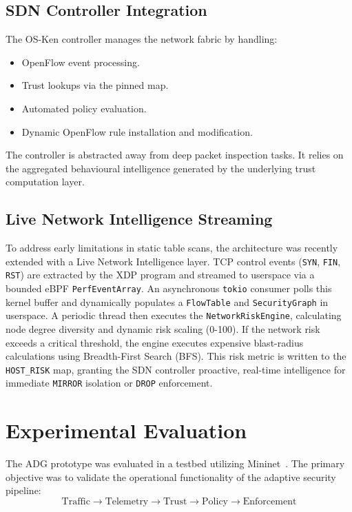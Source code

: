 \documentclass[conference]{IEEEtran}
\begin{document}
\subsection{SDN Controller Integration}
The OS-Ken controller manages the network fabric by handling:
\begin{itemize}
\item OpenFlow event processing.
\item Trust lookups via the pinned map.
\item Automated policy evaluation.
\item Dynamic OpenFlow rule installation and modification.
\end{itemize}
The controller is abstracted away from deep packet inspection tasks. It relies on the aggregated behavioural intelligence generated by the underlying trust computation layer.

\subsection{Live Network Intelligence Streaming}
To address early limitations in static table scans, the architecture was recently extended with a Live Network Intelligence layer. TCP control events (\texttt{SYN}, \texttt{FIN}, \texttt{RST}) are extracted by the XDP program and streamed to userspace via a bounded eBPF \texttt{PerfEventArray}. 
An asynchronous \texttt{tokio} consumer polls this kernel buffer and dynamically populates a \texttt{FlowTable} and \texttt{SecurityGraph} in userspace. 
A periodic thread then executes the \texttt{NetworkRiskEngine}, calculating node degree diversity and dynamic risk scaling (0-100). If the network risk exceeds a critical threshold, the engine executes expensive blast-radius calculations using Breadth-First Search (BFS). This risk metric is written to the \texttt{HOST\_RISK} map, granting the SDN controller proactive, real-time intelligence for immediate \texttt{MIRROR} isolation or \texttt{DROP} enforcement.


\section{Experimental Evaluation}

The ADG prototype was evaluated in a testbed utilizing Mininet~\cite{lantz2010mininet}. The primary objective was to validate the operational functionality of the adaptive security pipeline:
\begin{equation}
\text{Traffic} \rightarrow \text{Telemetry} \rightarrow \text{Trust} \rightarrow \text{Policy} \rightarrow \text{Enforcement}
\end{equation}
\end{document}
